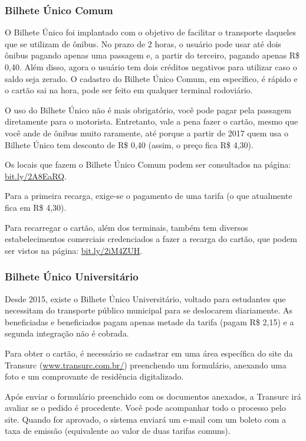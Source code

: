 \subsubsection{Bilhete Único Comum}

O Bilhete Único foi implantado com o objetivo de facilitar o transporte
daqueles que se utilizam de ônibus. No prazo de 2 horas, o usuário pode usar
até dois ônibus pagando apenas uma passagem e, a partir do terceiro, pagando
apenas R\$ 0,40. Além disso, agora o usuário tem dois créditos negativos para
utilizar caso o saldo seja zerado. O cadastro do Bilhete Único Comum, em
específico, é rápido e o cartão sai na hora, pode ser feito em qualquer
terminal rodoviário.

O uso do Bilhete Único não é mais obrigatório, você pode pagar pela passagem
diretamente para o motorista. Entretanto, vale a pena fazer o cartão, mesmo
que você ande de ônibus muito raramente, até porque a partir de 2017 quem
usa o Bilhete Único tem desconto de R\$ 0,40 (assim, o preço fica R\$ 4,30).

Os locais que fazem o Bilhete Único Comum podem ser consultados na página:
\url{bit.ly/2A8EaRQ}.

Para a primeira recarga, exige-se o pagamento de uma tarifa (o que atualmente
fica em R\$ 4,30).

Para recarregar o cartão, além dos terminais, também tem diversos
estabelecimentos comerciais credenciados a fazer a recarga do cartão, que podem
ser vistos na página: \url{bit.ly/2iM4ZUH}.

\subsubsection{Bilhete Único Universitário}

Desde 2015, existe o Bilhete Único Universitário, voltado para estudantes que
necessitam do transporte público municipal para se deslocarem diariamente. As
beneficiadas e beneficiados pagam apenas metade da tarifa (pagam R\$ 2,15) e a
segunda integração não é cobrada.

Para obter o cartão, é necessário se cadastrar em uma área específica do site
da Transurc (\url{www.transurc.com.br/}) preenchendo um formulário, anexando
uma foto e um comprovante de residência digitalizado.

Após enviar o formulário preenchido com os documentos anexados, a Transurc
irá avaliar se o pedido é procedente. Você pode acompanhar todo o processo pelo
site. Quando for aprovado, o sistema enviará um e-mail com um boleto com a taxa
de emissão (equivalente ao valor de duas tarifas comuns).

